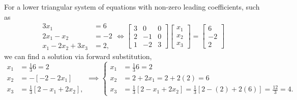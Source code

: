 For a lower triangular system of equations with non-zero leading coefficients, such as
\begin{equation}
    \begin{aligned}
     3 x_1 &=6 \\
     2 x_1 - x_2 &= -2\\
    x_1 - 2 x_2 + 3 x_3  &= 2,
    \end{aligned} \iff \left[\begin{array}{rrr} 3 & 0 & 0\\ 2 & -1 & 0 \\   1 & -2 & 3 \end{array} \right] \begin{bmatrix} x_1 \\ x_2 \\ x_3\end{bmatrix} = \left[\begin{array}{r} 6 \\ -2 \\ 2\end{array} \right]
\end{equation}
we can find a solution via forward substitution,
\begin{equation}
    \begin{aligned}
 x_1 &=\frac{1}{3} 6 = 2\\
 x_2 &= -\left[ -2 -2 x_1\right] \\
  x_3  &=\frac{1}{3}\left[ 2 -x_1 + 2 x_2 \right],
    \end{aligned} \implies \left\{ \begin{aligned}
     x_1 &=\frac{1}{3} 6 = 2\\
 x_2 &= 2 + 2 x_1 = 2 + 2(2)=6\\
     x_3  &=\frac{1}{3}\left[ 2 -x_1 + 2 x_2 \right]=\frac{1}{3}\left[ 2 -(2) + 2 (6) \right]=\frac{12}{3} =  4.
    \end{aligned} \right.
\end{equation}


